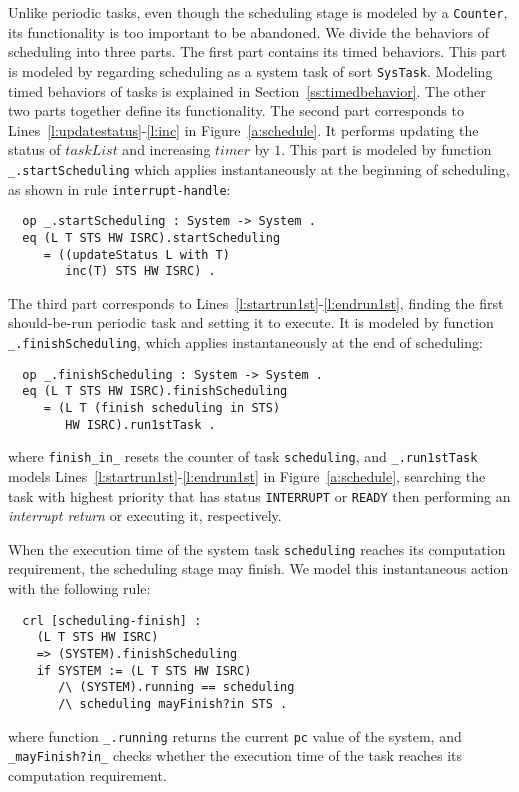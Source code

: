 \documentclass[10pt,journal,compsoc]{IEEEtran}
\newcommand{\hide}[1]{\ignorespaces}
\begin{document}
Unlike periodic tasks, even though the scheduling stage is modeled by
a \verb|Counter|, its functionality is too important to be abandoned.
We divide the behaviors of scheduling into three parts.  The first
part contains its timed behaviors. This part is modeled by regarding
scheduling as a system task of sort \verb|SysTask|. Modeling timed
behaviors of tasks is explained in Section~\ref{ss:timedbehavior}.
The other two parts together define its functionality. The second part
corresponds to Lines~\ref{l:updatestatus}-\ref{l:inc} in
Figure~\ref{a:schedule}. It performs updating the status of
$taskList$ and increasing $timer$ by $1$. This part is modeled by
function \verb|_.startScheduling| which applies instantaneously at the
beginning of scheduling, as shown in rule \verb|interrupt-handle|:
\begin{verbatim}
  op _.startScheduling : System -> System .
  eq (L T STS HW ISRC).startScheduling 
     = ((updateStatus L with T) 
        inc(T) STS HW ISRC) .
\end{verbatim}
The third part corresponds to
Lines~\ref{l:startrun1st}-\ref{l:endrun1st}, finding the first
should-be-run periodic task and setting it to execute. It is modeled
by function \verb|_.finishScheduling|, which applies instantaneously
at the end of scheduling:
\begin{verbatim}
  op _.finishScheduling : System -> System .
  eq (L T STS HW ISRC).finishScheduling
     = (L T (finish scheduling in STS) 
        HW ISRC).run1stTask .
\end{verbatim}
where \verb|finish_in_| resets the counter of task \verb|scheduling|,
and \verb|_.run1stTask| models
Lines~\ref{l:startrun1st}-\ref{l:endrun1st} in
Figure~\ref{a:schedule}, searching the task with highest priority
that has status \verb|INTERRUPT| or \verb|READY| then performing an
\emph{interrupt return} or executing it, respectively.

When the execution time of the system task \verb|scheduling| reaches
its computation requirement, the scheduling stage may finish. We model
this instantaneous action with the following rule:
\begin{verbatim}
  crl [scheduling-finish] :
    (L T STS HW ISRC) 
    => (SYSTEM).finishScheduling
    if SYSTEM := (L T STS HW ISRC) 
       /\ (SYSTEM).running == scheduling 
       /\ scheduling mayFinish?in STS .
\end{verbatim}
where function \verb|_.running| returns the current \verb|pc| value of
the system, and \verb|_mayFinish?in_| checks whether the execution
time of the task reaches its computation requirement.
\hide{
\begin{verbatim}
  op _mayFinish?in_ : Oid SysTasks ~> Bool .
  eq O mayFinish?in [ < O : SysTask | cnt : C > REST ] 
       = C mayFinish? .
  op _mayFinish? : Counter -> Bool .
  eq [ R / [ MIN , MAX ] ] mayFinish?
       = if R lt MIN then false else true fi .
\end{verbatim}}
\end{document}
